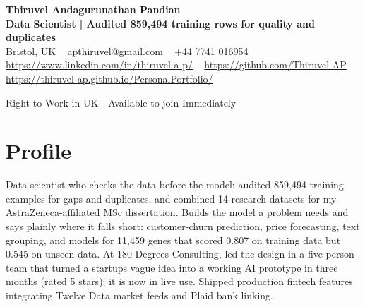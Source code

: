 \documentclass[a4paper,11pt]{article}
\newcommand{\num}[1]{\textbf{#1}}   %
\begin{document}
\begin{center}
  {\LARGE\bfseries Thiruvel Andagurunathan Pandian} \\[3pt]
  {\color{headernavy}\small\textbf{Data Scientist | Audited \num{859,494} training rows for quality and duplicates}} \\[3pt]
  {\small
  Bristol, UK\nobreak\ \,\textbar\, \href{mailto:apthiruvel@gmail.com}{apthiruvel@gmail.com}\nobreak\ \,\textbar\, \href{tel:+447741016954}{+44 7741 016954}\nobreak\ \,\textbar\, \href{https://www.linkedin.com/in/thiruvel-a-p/}{https://www.linkedin.com/in/thiruvel-a-p/}\nobreak\ \,\textbar\, \href{https://github.com/Thiruvel-AP}{https://github.com/Thiruvel-AP}\nobreak\ \,\textbar\, \href{https://thiruvel-ap.github.io/PersonalPortfolio/}{https://thiruvel-ap.github.io/PersonalPortfolio/}}\par\vspace{4pt}
  \noindent{} Right to Work in UK \,\textbar\, Available to join Immediately
\end{center}

\section{Profile}
Data scientist who checks the data before the model: audited 859,494 training examples for gaps and duplicates, and combined 14 research datasets for my AstraZeneca-affiliated MSc dissertation. Builds the model a problem needs and says plainly where it falls short: customer-churn prediction, price forecasting, text grouping, and models for 11,459 genes that scored 0.807 on training data but 0.545 on unseen data. At 180 Degrees Consulting, led the design in a five-person team that turned a startup\textquotesingle{}s vague idea into a working AI prototype in three months (rated 5 stars); it is now in live use. Shipped production fintech features integrating Twelve Data market feeds and Plaid bank linking.
\end{document}

